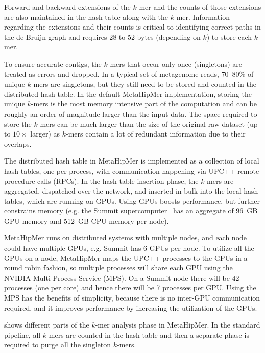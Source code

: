 Forward and backward extensions of the $k$-mer and the counts of those extensions are also maintained in the hash table along with the $k$-mer. Information regarding the extensions and their counts is critical to identifying correct paths in the de Bruijn graph and requires 28 to 52 bytes (depending on $k$) to store each $k$-mer.

To ensure accurate contigs, the $k$-mers that occur only once (singletons) are
treated as errors and dropped. In a typical set of metagenome reads, 70--80\%
of unique $k$-mers are singletons, but they still need to be stored and counted
in the distributed hash table. In the default MetaHipMer implementation, storing the unique $k$-mers is the most memory intensive part of the computation and can be roughly an order of magnitude larger than the input data.  The space required to store the $k$-mers can be much larger than the size of the original raw dataset (up to $10\times$ larger) as $k$-mers contain a lot of redundant information due to their overlaps.



The distributed hash table in MetaHipMer is implemented as a collection of local hash tables, one per process, with communication happening via UPC++ remote procedure calls (RPCs). In the hash table insertion phase, the $k$-mers are aggregated, dispatched over the network, and inserted in bulk into the local hash tables, which are running on GPUs. Using GPUs boosts performance, but further constrains memory (e.g. the Summit supercomputer~\cite{VazhkudaiDBG18} has an aggregate of 96~GB GPU memory and 512~GB CPU memory per node).

MetaHipMer runs on distributed systems with multiple nodes, and each node could have multiple GPUs, e.g. Summit has 6 GPUs per node. To utilize all the GPUs on a node, MetaHipMer maps the UPC++ processes to the GPUs in a round robin fashion, so multiple processes will share each GPU using the NVIDIA Multi-Process Service (MPS)\@. On a Summit node there will be 42 processes (one per core) and hence there will be 7 processes per GPU\@. Using the MPS has the benefits of simplicity, because there is no inter-GPU communication required, and it improves performance by increasing the utilization of the GPUs.


 shows different parts of the $k$-mer analysis phase in
MetaHipMer. In the standard pipeline, all $k$-mers are counted in the hash table and then a separate phase is required to purge all the singleton $k$-mers.

